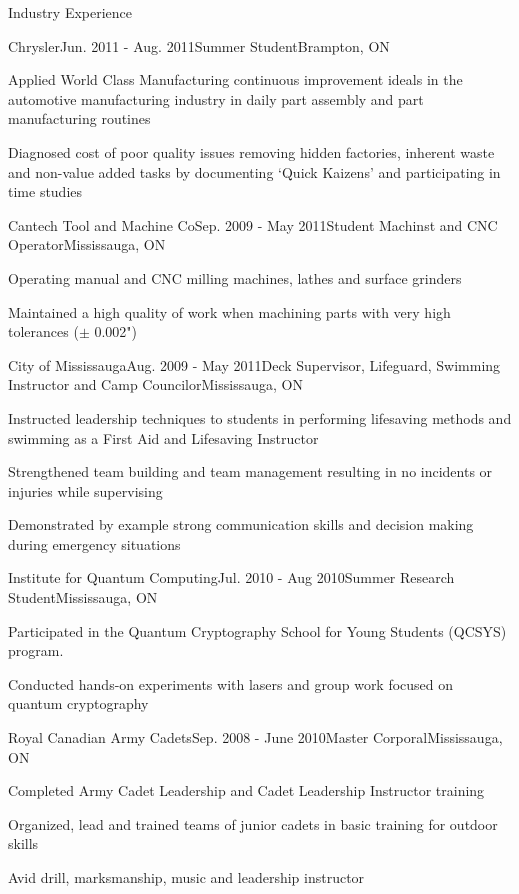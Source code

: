 \documentclass{resume} %
\begin{document}
\begin{rSection}{Industry Experience}
\begin{rSubsection}{Chrysler}{Jun. 2011 - Aug. 2011}{Summer Student}{Brampton, ON}
\item Applied World Class Manufacturing continuous improvement ideals in the automotive manufacturing industry in daily part assembly and part manufacturing routines
\item Diagnosed cost of poor quality issues removing hidden factories, inherent waste and non-value added tasks by documenting ‘Quick Kaizens’ and participating in time studies
\end{rSubsection}

\begin{rSubsection}{Cantech Tool and Machine Co}{Sep. 2009 - May 2011}{Student Machinst and CNC Operator}{Mississauga, ON}
\item Operating manual and CNC milling machines, lathes and surface grinders
\item Maintained a high quality of work when machining parts with very high tolerances ($\pm$ 0.002")
\end{rSubsection}

\begin{rSubsection}{City of Mississauga}{Aug. 2009 - May 2011}{Deck Supervisor, Lifeguard, Swimming Instructor and Camp Councilor}{Mississauga, ON}
\item Instructed leadership techniques to students in performing lifesaving methods and swimming as a First Aid and Lifesaving Instructor
\item Strengthened team building and team management resulting in no incidents or injuries while supervising
\item Demonstrated by example strong communication skills and decision making during emergency situations
\end{rSubsection}

\begin{rSubsection}{Institute for Quantum Computing}{Jul. 2010 - Aug 2010}{Summer Research Student}{Mississauga, ON}
\item Participated in the Quantum Cryptography School for Young Students (QCSYS) program.
\item Conducted hands-on experiments with lasers and group work focused on quantum cryptography
\end{rSubsection}

\begin{rSubsection}{Royal Canadian Army Cadets}{Sep. 2008 - June 2010}{Master Corporal}{Mississauga, ON}
\item Completed Army Cadet Leadership and Cadet Leadership Instructor training
\item Organized, lead and trained teams of junior cadets in basic training for outdoor skills
\item Avid drill, marksmanship, music and leadership instructor
\end{rSubsection}

\end{rSection}
\end{document}
